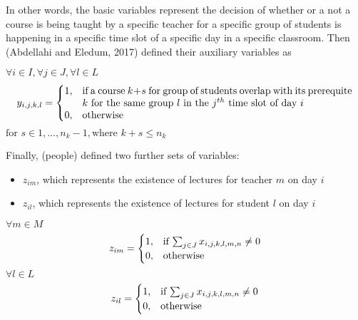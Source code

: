 \documentclass[a4paper, 12pt]{report}
\begin{document}
In other words, the basic variables represent the decision of whether or a not
a course is being taught by a specific teacher for a specific group of students
is happening in a specific time slot of a specific day in a specific classroom.
Then (Abdellahi and Eledum, 2017) defined their auxiliary variables as

\begin{math}
	\forall i \in I, \forall j \in J, \forall l \in L
\end{math}
\begin{align*}
	y_{i,j,k,l} = 
	\begin{cases}
		1, & \parbox[t]{9.5cm}{if a course \( k + s \) for group of students
		overlap with its prerequite \( k \) for the same group \( l \) in the 
		\( j^{th} \) time slot of day \( i \)} \\
		0, & \text{otherwise}
	\end{cases}	
\end{align*}
\begin{math}
	\text{for } s \in 1, \ldots, n_k - 1, \text{where } k + s \leq n_k	
\end{math}

Finally, (people) defined two further sets of variables:
\begin{itemize}
	\item \( z_{im} \), which represents the existence of lectures for teacher 
		\( m \) on day \( i \)
	\item \( z_{il} \), which represents the existence of lectures for student 
		\( l \) on day \( i \)
\end{itemize}
\begin{math}
	\forall m \in M
\end{math}
\begin{align*}
	z_{im} =
	\begin{cases}
		1, & \text{if \( \sum_{j \in J} x_{i,j,k,l,m,n} \neq 0 \)} \\
		0, & \text{otherwise}
	\end{cases}	
\end{align*}
\begin{math}
	\forall l \in L
\end{math}
\begin{align*}
	z_{il} =
	\begin{cases}
		1, & \text{if \( \sum_{j \in J} x_{i,j,k,l,m,n} \neq 0 \)} \\
		0, & \text{otherwise}
	\end{cases}	
\end{align*}
\end{document}
